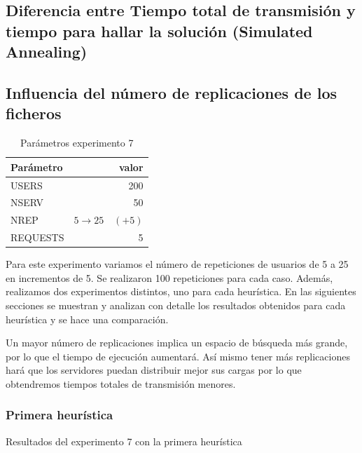 \subsection{Diferencia entre Tiempo total de transmisión y tiempo para hallar la solución (Simulated Annealing)}

\subsection{Influencia del número de replicaciones de los ficheros}

\begin{table}[H]
    \caption{Parámetros experimento 7}%
    \label{tab:ex7_par}
    \begin{center}
    \begin{tabular}{lr}
    \toprule
    Parámetro & valor \\
    \midrule
    USERS & 200 \\
    NSERV & 50 \\
    NREP & $5 \to 25 \quad (+5)$ \\
    REQUESTS & 5\\
    \bottomrule
    \end{tabular}
    \end{center}
\end{table}

Para este experimento variamos el número de repeticiones de usuarios de 5 a 25 en incrementos de 5. Se realizaron 100
repeticiones para cada caso. Además, realizamos dos experimentos distintos, uno para cada heurística. En las
siguientes secciones se muestran y analizan con detalle los resultados obtenidos para cada heurística y se hace una
comparación.

\begin{hyp*}
    Un mayor número de replicaciones implica un espacio de búsqueda más grande, por lo que el tiempo de ejecución
    aumentará. Así mismo tener más replicaciones hará que los servidores puedan distribuir mejor sus cargas por
    lo que obtendremos tiempos totales de transmisión menores.
\end{hyp*}

\subsubsection{Primera heurística}
\begin{table}[H]
    \centering
    \caption{Resultados del experimento 7 con la primera heurística}%
    \label{tab:ex7}
    \begin{center}
    
    \end{center}
\end{table}


